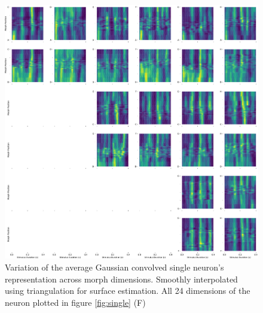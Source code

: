 \begin{figure}[tbp] 
  \centering
  \includegraphics[width=\textwidth]{figures/supplemental/sfig04_morph_viz_all.pdf}
  \caption[Morph activity for 24 morph dimensions for a single neuron]
{Variation of the average Gaussian convolved single neuron’s representation across morph dimensions. Smoothly interpolated using triangulation for surface estimation. All 24 dimensions of the neuron plotted in figure \ref{fig:single} (F)
}
  \label{fig:single24}
\end{figure}